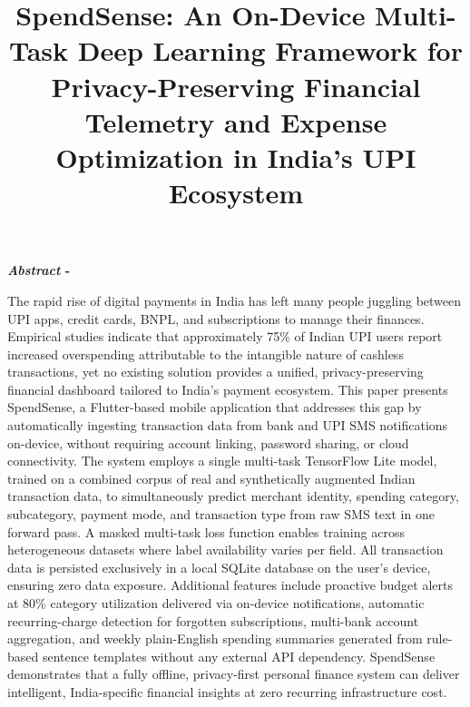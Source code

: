 \documentclass[conference]{IEEEtran}
\renewenvironment{abstract}{%
  \normalfont\footnotesize
  \bfseries\textit{Abstract} - \normalfont\footnotesize\ignorespaces
}{%
  \vspace{0.6ex}\par
}
\begin{document}
\title{SpendSense: An On-Device Multi-Task Deep Learning Framework for Privacy-Preserving Financial Telemetry and Expense Optimization in India's UPI Ecosystem}

\author{
}

\maketitle

\begin{abstract}
The rapid rise of digital payments in India has left many people juggling between UPI apps, credit cards, BNPL, and subscriptions to manage their finances. Empirical studies indicate that approximately 75\% of Indian UPI users report increased overspending attributable to the intangible nature of cashless transactions, yet no existing solution provides a unified, privacy-preserving financial dashboard tailored to India's payment ecosystem. This paper presents SpendSense, a Flutter-based mobile application that addresses this gap by automatically ingesting transaction data from bank and UPI SMS notifications on-device, without requiring account linking, password sharing, or cloud connectivity. The system employs a single multi-task TensorFlow Lite model, trained on a combined corpus of real and synthetically augmented Indian transaction data, to simultaneously predict merchant identity, spending category, subcategory, payment mode, and transaction type from raw SMS text in one forward pass. A masked multi-task loss function enables training across heterogeneous datasets where label availability varies per field. All transaction data is persisted exclusively in a local SQLite database on the user's device, ensuring zero data exposure. Additional features include proactive budget alerts at 80\% category utilization delivered via on-device notifications, automatic recurring-charge detection for forgotten subscriptions, multi-bank account aggregation, and weekly plain-English spending summaries generated from rule-based sentence templates without any external API dependency. SpendSense demonstrates that a fully offline, privacy-first personal finance system can deliver intelligent, India-specific financial insights at zero recurring infrastructure cost.
\end{abstract}
\end{document}
